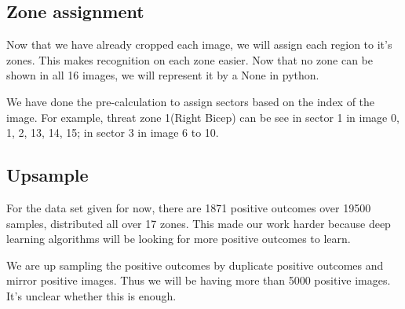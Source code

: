 \documentclass[conference,compsoc]{IEEEtran}
\begin{document}
\subsection{Zone assignment}
Now that we have already cropped each image, we will assign each region to it's zones. This makes recognition on each zone easier. Now that no zone can be shown in all 16 images, we will represent it by a None in python.

We have done the pre-calculation to assign sectors based on the index of the image. For example, threat zone 1(Right Bicep) can be see in sector 1 in image 0, 1, 2, 13, 14, 15; in sector 3 in image 6 to 10.

\subsection{Upsample}
For the data set given for now, there are 1871 positive outcomes over 19500 samples, distributed all over 17 zones. This made our work harder because deep learning algorithms will be looking for more positive outcomes to learn. 

We are up sampling the positive outcomes by duplicate positive outcomes and mirror positive images. Thus we will be having more than 5000 positive images. It's unclear whether this is enough.
        



\end{document}
